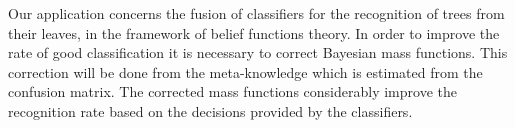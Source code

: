 
Our application concerns the fusion of classifiers for the recognition of trees from their leaves, in the framework of belief functions theory. In order to improve the rate of good classification it is necessary to correct Bayesian mass functions. This correction will be done from the meta-knowledge which is estimated from the confusion matrix. The corrected mass functions considerably improve the recognition rate based on the decisions provided by the classifiers.

